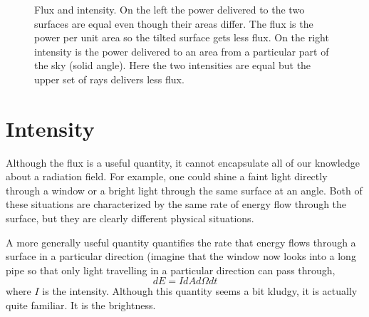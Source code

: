 \begin{figure}
\caption{Flux and intensity.  On the left the power delivered to the
  two surfaces are equal even though their areas differ.  The flux is
  the power per unit area so the tilted surface gets less flux.  On
  the right intensity is the power delivered to an area from a
  particular part of the sky (solid angle).  Here the two intensities
  are equal but the upper set of rays delivers less flux.}
\end{figure}
\section{Intensity}
\label{sec:intensity}

Although the flux is a useful quantity, it cannot encapsulate all of
our knowledge about a radiation field.  For example, one could shine a
faint light directly through a window or a bright light through the
same surface at an angle.  Both of these situations are characterized
by the same rate of energy flow through the surface, but they are
clearly different physical situations.

A more generally useful quantity quantifies the rate that energy flows
through a surface in a particular direction (imagine that the window
now looks into a long pipe so that only light travelling in a
particular direction can pass through,
\begin{equation}
dE = I d\!A d \Omega dt 
\label{eq:4}
\end{equation}
where $I$ is the intensity. Although this quantity seems a bit kludgy,
it is actually quite familiar.  It is the brightness.

